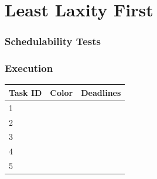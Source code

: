 \documentclass[xcolor=table]{beamer}
\begin{document}
\section{Least Laxity First}

\begin{frame}
\frametitle{Schedulability Tests}

\end{frame}

\begin{frame}
\frametitle{Execution}

\begin{table}[]
\begin{tabular}{|l|l|l|}
\hline
Task ID & Color                    & Deadlines \\ \hline
1       & \cellcolor[HTML]{FFCC67} &  \\ \hline
2       & \cellcolor[HTML]{FFC702} & \\ \hline
3       & \cellcolor[HTML]{6200C9} & \\ \hline
4       & \cellcolor[HTML]{303498} & \\ \hline
5       & \cellcolor[HTML]{FD6864} & \\ \hline
\end{tabular}
\end{table}

\begin{table}[]
\end{table}

\end{frame}
\end{document}
